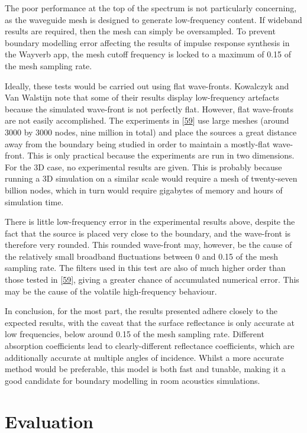 \documentclass[]{scrreprt}
\begin{document}
The poor performance at the top of the spectrum is not particularly
concerning, as the waveguide mesh is designed to generate low-frequency
content. If wideband results are required, then the mesh can simply be
oversampled. To prevent boundary modelling error affecting the results
of impulse response synthesis in the Wayverb app, the mesh cutoff
frequency is locked to a maximum of 0.15 of the mesh sampling rate.

Ideally, these tests would be carried out using flat wave-fronts.
Kowalczyk and Van Walstijn note that some of their results display
low-frequency artefacts because the simulated wave-front is not
perfectly flat. However, flat wave-fronts are not easily accomplished.
The experiments in
{[}\protect\hyperlink{ref-kowalczykux5fmodelingux5f2008}{59}{]} use
large meshes (around 3000 by 3000 nodes, nine million in total) and
place the sources a great distance away from the boundary being studied
in order to maintain a mostly-flat wave-front. This is only practical
because the experiments are run in two dimensions. For the 3D case, no
experimental results are given. This is probably because running a 3D
simulation on a similar scale would require a mesh of twenty-seven
billion nodes, which in turn would require gigabytes of memory and hours
of simulation time.

There is little low-frequency error in the experimental results above,
despite the fact that the source is placed very close to the boundary,
and the wave-front is therefore very rounded. This rounded wave-front
may, however, be the cause of the relatively small broadband
fluctuations between 0 and 0.15 of the mesh sampling rate. The filters
used in this test are also of much higher order than those tested in
{[}\protect\hyperlink{ref-kowalczykux5fmodelingux5f2008}{59}{]}, giving
a greater chance of accumulated numerical error. This may be the cause
of the volatile high-frequency behaviour.

In conclusion, for the most part, the results presented adhere closely
to the expected results, with the caveat that the surface reflectance is
only accurate at low frequencies, below around 0.15 of the mesh sampling
rate. Different absorption coefficients lead to clearly-different
reflectance coefficients, which are additionally accurate at multiple
angles of incidence. Whilst a more accurate method would be preferable,
this model is both fast and tunable, making it a good candidate for
boundary modelling in room acoustics simulations.

\chapter{Evaluation}\label{evaluation-1}
\end{document}

